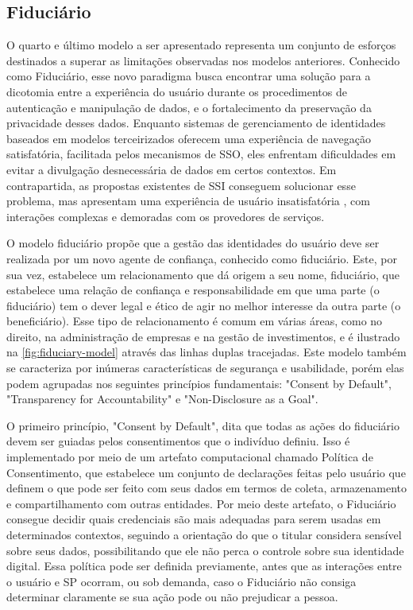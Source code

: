 \subsection{Fiduciário}\label{subsection:fiduciário}

O quarto e último modelo a ser apresentado representa um conjunto de esforços destinados a superar as limitações observadas nos modelos anteriores. Conhecido como Fiduciário, esse novo paradigma busca encontrar uma solução para a dicotomia entre a experiência do usuário durante os procedimentos de autenticação e manipulação de dados, e o fortalecimento da preservação da privacidade desses dados. Enquanto sistemas de gerenciamento de identidades baseados em modelos terceirizados oferecem uma experiência de navegação satisfatória, facilitada pelos mecanismos de \acs{SSO}, eles enfrentam dificuldades em evitar a divulgação desnecessária de dados em certos contextos. Em contrapartida, as propostas existentes de \acs{SSI} conseguem solucionar esse problema, mas apresentam uma experiência de usuário insatisfatória \cite{fiduciary}, com interações complexas e demoradas com os provedores de serviços.

O modelo fiduciário propõe que a gestão das identidades do usuário deve ser realizada por um novo agente de confiança, conhecido como fiduciário. Este, por sua vez, estabelece um relacionamento que dá origem a seu nome, fiduciário, que estabelece uma relação de confiança e responsabilidade em que uma parte (o fiduciário) tem o dever legal e ético de agir no melhor interesse da outra parte (o beneficiário). Esse tipo de relacionamento é comum em várias áreas, como no direito, na administração de empresas e na gestão de investimentos, e é ilustrado na \autoref{fig:fiduciary-model} através das linhas duplas tracejadas. Este modelo também se caracteriza por inúmeras características de segurança e usabilidade, porém elas podem agrupadas nos seguintes princípios fundamentais: "Consent by Default", "Transparency for Accountability" e "Non-Disclosure as a Goal".




O primeiro princípio, "Consent by Default", dita que todas as ações do fiduciário devem ser guiadas pelos consentimentos que o indivíduo definiu. Isso é implementado por meio de um artefato computacional chamado Política de Consentimento, que estabelece um conjunto de declarações feitas pelo usuário que definem o que pode ser feito com seus dados em termos de coleta, armazenamento e compartilhamento com outras entidades. Por meio deste artefato, o Fiduciário consegue decidir quais credenciais são mais adequadas para serem usadas em determinados contextos, seguindo a orientação do que o titular considera sensível sobre seus dados, possibilitando que ele não perca o controle sobre sua identidade digital. Essa política pode ser definida previamente, antes que as interações entre o usuário e \acs{SP} ocorram, ou sob demanda, caso o Fiduciário não consiga determinar claramente se sua ação pode ou não prejudicar a pessoa.

